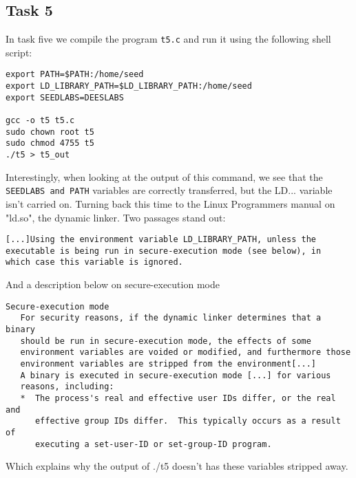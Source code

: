 \documentclass{article}
\begin{document}
\subsection{Task 5}
In task five we compile the program \verb!t5.c! and run it using the following
shell script:
\begin{verbatim}
export PATH=$PATH:/home/seed
export LD_LIBRARY_PATH=$LD_LIBRARY_PATH:/home/seed
export SEEDLABS=DEESLABS

gcc -o t5 t5.c
sudo chown root t5
sudo chmod 4755 t5
./t5 > t5_out
\end{verbatim}
Interestingly, when looking at the output of this command, we see that the 
\verb!SEEDLABS and PATH! variables are correctly transferred, but the LD... variable
isn't carried on. Turning back this time to the Linux Programmers manual on "ld.so",
the dynamic linker. Two passages stand out:
\begin{verbatim}
[...]Using the environment variable LD_LIBRARY_PATH, unless the
executable is being run in secure-execution mode (see below), in
which case this variable is ignored.
\end{verbatim}
And a description below on secure-execution mode
\begin{verbatim}
Secure-execution mode
   For security reasons, if the dynamic linker determines that a binary
   should be run in secure-execution mode, the effects of some
   environment variables are voided or modified, and furthermore those
   environment variables are stripped from the environment[...]
   A binary is executed in secure-execution mode [...] for various
   reasons, including:
   *  The process's real and effective user IDs differ, or the real and
      effective group IDs differ.  This typically occurs as a result of
      executing a set-user-ID or set-group-ID program.
\end{verbatim}

Which explains why the output of ./t5 doesn't has these variables stripped away.
\end{document}

